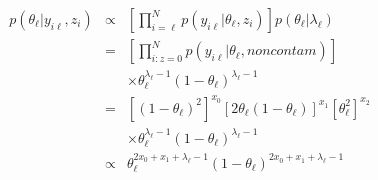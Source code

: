 \begin{eqnarray} \label{theta_simpfc}
p(\theta_{\ell}|y_{i\ell},z_i) &\propto& [\prod_{i=\ell}^{N} p(y_{i\ell}|\theta_{\ell},z_i)]p(\theta_{\ell}|\lambda_{\ell}) \nonumber \\
&=& [\prod_{i:z=0}^{N} p(y_{i\ell}|\theta_{\ell},noncontam)] \nonumber \\
& & \times \theta_{\ell}^{\lambda_{\ell} - 1}(1-\theta_{\ell})^{\lambda_{\ell} - 1} \nonumber \\
&=& [(1-\theta_{\ell})^2]^{x_0}[2\theta_{\ell}(1-\theta_{\ell})]^{x_1}[\theta_{\ell}^2]^{x_2} \nonumber \\
& & \times \theta_{\ell}^{\lambda_{\ell} - 1}(1 - \theta_{\ell})^{\lambda_{\ell} - 1} \nonumber \\
& \propto& \theta_{\ell}^{2x_0 + x_1 + \lambda_{\ell} - 1}(1-\theta_{\ell})^{2x_0 + x_1 + \lambda_{\ell} - 1}
\end{eqnarray}